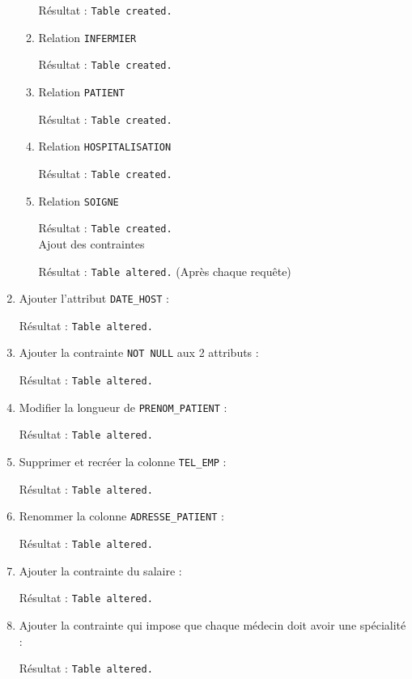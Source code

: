 \documentclass[12pt,a4paper]{article}
\begin{document}
\begin{enumerate}
\begin{enumerate}
					
						Résultat : \texttt{Table created.}
				\item Relation \texttt{INFERMIER}
					
						Résultat : \texttt{Table created.}
				\item Relation \texttt{PATIENT}
					
						Résultat : \texttt{Table created.}
				\item Relation \texttt{HOSPITALISATION}
					
						Résultat : \texttt{Table created.}
				\item Relation \texttt{SOIGNE}
					
						Résultat : \texttt{Table created.}\\
				Ajout des contraintes
				
				Résultat : \texttt{Table altered.} (Après chaque requête)
			\end{enumerate}
		\item Ajouter l'attribut \texttt{DATE\_HOST} :
		
		Résultat : \texttt{Table altered.}
		\item Ajouter la contrainte \texttt{NOT NULL} aux 2 attributs :
		
		Résultat : \texttt{Table altered.}
		\item Modifier la longueur de \texttt{PRENOM\_PATIENT} :
		
		Résultat : \texttt{Table altered.}
		\item Supprimer et recréer la colonne \texttt{TEL\_EMP} :
		
		Résultat : \texttt{Table altered.}
		\item Renommer la colonne \texttt{ADRESSE\_PATIENT} :
		
		Résultat : \texttt{Table altered.}
		\item Ajouter la contrainte du salaire :
		
		Résultat : \texttt{Table altered.}
		\item Ajouter la contrainte qui impose que chaque médecin doit avoir une spécialité :
		
		Résultat : \texttt{Table altered.}
	\end{enumerate}
\end{document}

